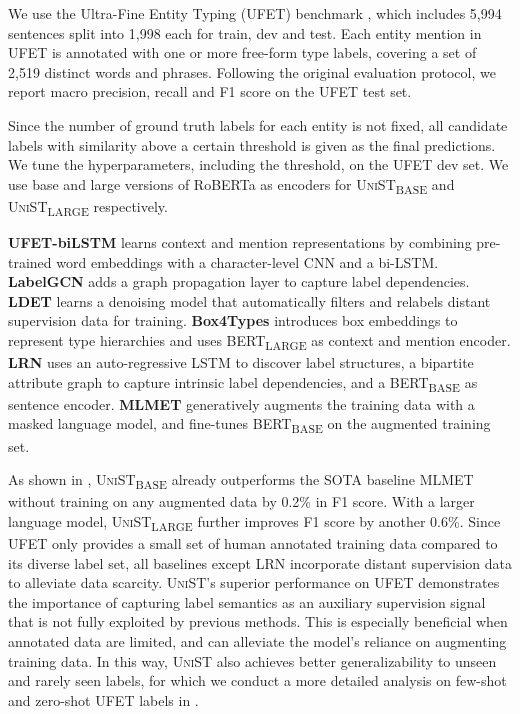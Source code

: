 \documentclass[11pt]{article}
\newcommand{\model}{\textsc{UniST}\xspace}
\newcommand{\basemodel}{\textsc{UniST}\textsubscript{BASE}}
\newcommand{\largemodel}{\textsc{UniST}\textsubscript{LARGE}}
\newcommand{\stitle}[1]{\vspace{1ex} \noindent{\bf #1}}
\begin{document}
\stitle{Dataset.}
We use the Ultra-Fine Entity Typing (UFET) benchmark \cite{choi-etal-2018-ultra}, which includes 5,994 sentences split into 1,998 each for train, dev and test. Each entity mention in UFET is annotated with one or more free-form type labels, covering a set of 2,519 distinct words and phrases. Following the original evaluation protocol, we report macro precision, recall and F1 score on the UFET test set.

\stitle{Model.}
Since the number of ground truth labels for each entity is not fixed, all candidate labels with similarity above a certain threshold is given as the final predictions. We tune the hyperparameters, including the threshold, on the UFET dev set. We use base and large versions of RoBERTa as encoders for \basemodel\xspace and \largemodel\xspace respectively.

\stitle{Baselines.} \textbf{UFET-biLSTM} \cite{choi-etal-2018-ultra} learns context and mention representations by combining pre-trained word embeddings with a character-level CNN and a bi-LSTM. \textbf{LabelGCN} \cite{xiong-etal-2019-imposing} adds a graph propagation layer to capture label dependencies. \textbf{LDET} \cite{onoe-durrett-2019-learning} learns a denoising model that automatically filters and relabels distant supervision data for training. \textbf{Box4Types} \cite{onoe-etal-2021-modeling} introduces box embeddings to represent type hierarchies and uses BERT\textsubscript{LARGE} as context and mention encoder. \textbf{LRN} \cite{liu-etal-2021-fine} uses an auto-regressive LSTM to discover label structures, a bipartite attribute graph to capture intrinsic label dependencies, and a BERT\textsubscript{BASE} as sentence encoder. \textbf{MLMET} \cite{dai-etal-2021-ultra} generatively augments the training data with a masked language model, and fine-tunes BERT\textsubscript{BASE} on the augmented training set.

\stitle{Results.}
As shown in , \basemodel\xspace already outperforms the SOTA baseline MLMET without training on any augmented data by 0.2\% in F1 score. With a larger language model, \largemodel\xspace further improves F1 score by another 0.6\%. Since UFET only provides a small set of human annotated training data compared to its diverse label set, all baselines except LRN incorporate distant supervision data to alleviate data scarcity. \model's superior performance on UFET demonstrates the importance of capturing label semantics as an auxiliary supervision signal that is not fully exploited by previous methods. This is especially beneficial when annotated data are limited, and can alleviate the model's reliance on augmenting training data. In this way, \model also achieves better generalizability to unseen and rarely seen labels, for which we conduct a more detailed analysis on few-shot and zero-shot UFET labels in .
\end{document}
